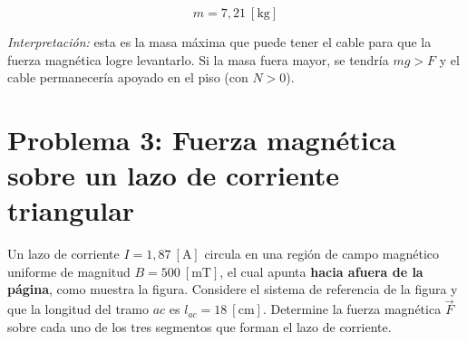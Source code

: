 \documentclass[12pt,letterpaper]{article}
\begin{document}
\[
    \boxed{m = 7{,}21\ [\text{kg}]}
\]

\noindent\small\textit{Interpretaci\'on:} esta es la masa m\'axima que puede tener el cable para
que la fuerza magn\'etica logre levantarlo. Si la masa fuera mayor, se tendr\'ia $mg > F$ y el
cable permanecer\'ia apoyado en el piso (con $N > 0$).
\normalsize

\newpage

\section*{Problema 3: Fuerza magn\'etica sobre un lazo de corriente triangular}

\noindent Un lazo de corriente $I = 1{,}87\ [\text{A}]$ circula en una regi\'on de campo magn\'etico
uniforme de magnitud $B = 500\ [\text{mT}]$, el cual apunta \textbf{hacia afuera de la p\'agina},
como muestra la figura. Considere el sistema de referencia de la figura y que la longitud del tramo
$ac$ es $l_{ac} = 18\ [\text{cm}]$. Determine la fuerza magn\'etica $\vec{F}$ sobre cada uno de los
tres segmentos que forman el lazo de corriente.

\medskip
\end{document}
